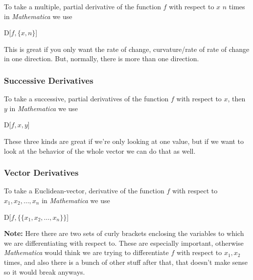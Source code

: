 \documentclass[11pt,letterpaper,twoside,titlepage]{book}
\newcommand{\Mathematica}{\textit{Mathematica} }
\begin{document}
						To take a multiple, partial derivative of the function $f$ with respect to $x$ $n$ times in \Mathematica we use 
					
						\begin{center}
					
							D[$f,\{x,n\}$]
					
						\end{center}
					
						This is great if you only want the rate of change, curvature/rate of rate of change in one direction.  But, normally, there is more than one direction.
					
					\subsubsection{Successive Derivatives}
				
						To take a successive, partial derivatives of the function $f$ with respect to $x$, then $y$ in \Mathematica we use 
					
						\begin{center}
					
							D[$f,x,y$]
						
						\end{center}
					
						These three kinds are great if we're only looking at one value, but if we want to look at the behavior of the whole vector we can do that as well.
					
					\subsubsection{Vector Derivatives}
				
						To take a Euclidean-vector, derivative of the function $f$ with respect to $x_1, x_2, \dots, x_n$ in \Mathematica we use 
					
						\begin{center}
					
							D[$f, \{ \{x_1, x_2, \dots, x_n\} \}$]
					
						\end{center}
					
						\textbf{Note:} Here there are two sets of curly brackets enclosing the variables to which we are differentiating with respect to.  These are especially important, otherwise \Mathematica would think we are trying to differentiate $f$ with respect to $x_1, x_2$ times, and also there is a bunch of other stuff after that, that doesn't make sense so it would break anyways.  
						
\end{document}
